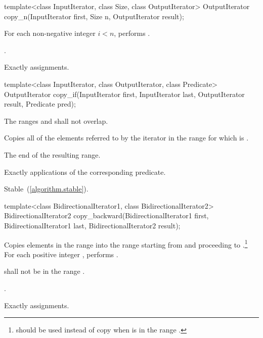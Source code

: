 %
\begin{itemdecl}
template<class InputIterator, class Size, class OutputIterator>
  OutputIterator copy_n(InputIterator first, Size n,
                        OutputIterator result);
\end{itemdecl}


\begin{itemdescr}
\pnum
\effects For each non-negative integer 
$i < n$, performs .

\pnum
\returns {}.

\pnum
\complexity Exactly  assignments.
\end{itemdescr}

%
\begin{itemdecl}
template<class InputIterator, class OutputIterator, class Predicate>
  OutputIterator copy_if(InputIterator first, InputIterator last,
                         OutputIterator result, Predicate pred);
\end{itemdecl}


\begin{itemdescr}
\pnum
\requires The ranges  and  shall not overlap.

\pnum
\effects Copies all of the elements referred to by the iterator  in the range 
for which  is .

\pnum
\returns The end of the resulting range.

\pnum
\complexity Exactly  applications of the corresponding predicate.

\pnum
\remarks Stable~(\ref{algorithm.stable}).
\end{itemdescr}


%
\begin{itemdecl}
template<class BidirectionalIterator1, class BidirectionalIterator2>
  BidirectionalIterator2
    copy_backward(BidirectionalIterator1 first,
                  BidirectionalIterator1 last,
                  BidirectionalIterator2 result);
\end{itemdecl}

\begin{itemdescr}
\pnum
\effects
Copies elements in the range 
into the
range 
starting from
and proceeding to .\footnote{
should be used instead of copy when 
is in
the range
.}
For each positive integer
,
performs
.

\pnum
\requires
{}
shall not be in the range
.

\pnum
\returns
{}.

\pnum
\complexity
Exactly
assignments.
\end{itemdescr}

